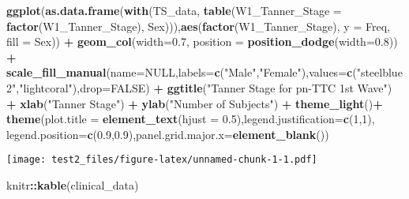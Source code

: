 \documentclass[]{article}
\newenvironment{Shaded}{\begin{snugshade}}{\end{snugshade}}
\newcommand{\KeywordTok}[1]{\textcolor[rgb]{0.13,0.29,0.53}{\textbf{#1}}}
\newcommand{\DataTypeTok}[1]{\textcolor[rgb]{0.13,0.29,0.53}{#1}}
\newcommand{\DecValTok}[1]{\textcolor[rgb]{0.00,0.00,0.81}{#1}}
\newcommand{\FloatTok}[1]{\textcolor[rgb]{0.00,0.00,0.81}{#1}}
\newcommand{\StringTok}[1]{\textcolor[rgb]{0.31,0.60,0.02}{#1}}
\newcommand{\OtherTok}[1]{\textcolor[rgb]{0.56,0.35,0.01}{#1}}
\newcommand{\OperatorTok}[1]{\textcolor[rgb]{0.81,0.36,0.00}{\textbf{#1}}}
\newcommand{\NormalTok}[1]{#1}
\begin{document}
\begin{Shaded}
\begin{Highlighting}[]
\KeywordTok{ggplot}\NormalTok{(}\KeywordTok{as.data.frame}\NormalTok{(}\KeywordTok{with}\NormalTok{(TS_data, }\KeywordTok{table}\NormalTok{(}\DataTypeTok{W1_Tanner_Stage =} \KeywordTok{factor}\NormalTok{(W1_Tanner_Stage), Sex))),}\KeywordTok{aes}\NormalTok{(}\KeywordTok{factor}\NormalTok{(W1_Tanner_Stage), }\DataTypeTok{y =}\NormalTok{ Freq, }\DataTypeTok{fill =}\NormalTok{ Sex)) }\OperatorTok{+}
\StringTok{  }\KeywordTok{geom_col}\NormalTok{(}\DataTypeTok{width=}\FloatTok{0.7}\NormalTok{, }\DataTypeTok{position =} \KeywordTok{position_dodge}\NormalTok{(}\DataTypeTok{width=}\FloatTok{0.8}\NormalTok{)) }\OperatorTok{+}\StringTok{ }
\StringTok{  }\KeywordTok{scale_fill_manual}\NormalTok{(}\DataTypeTok{name=}\OtherTok{NULL}\NormalTok{,}\DataTypeTok{labels=}\KeywordTok{c}\NormalTok{(}\StringTok{"Male"}\NormalTok{,}\StringTok{"Female"}\NormalTok{),}\DataTypeTok{values=}\KeywordTok{c}\NormalTok{(}\StringTok{"steelblue2"}\NormalTok{,}\StringTok{"lightcoral"}\NormalTok{),}\DataTypeTok{drop=}\OtherTok{FALSE}\NormalTok{) }\OperatorTok{+}
\StringTok{  }\KeywordTok{ggtitle}\NormalTok{(}\StringTok{"Tanner Stage for pn-TTC 1st Wave"}\NormalTok{) }\OperatorTok{+}
\StringTok{  }\KeywordTok{xlab}\NormalTok{(}\StringTok{"Tanner Stage"}\NormalTok{) }\OperatorTok{+}
\StringTok{  }\KeywordTok{ylab}\NormalTok{(}\StringTok{"Number of Subjects"}\NormalTok{) }\OperatorTok{+}
\StringTok{  }\KeywordTok{theme_light}\NormalTok{()}\OperatorTok{+}
\StringTok{  }\KeywordTok{theme}\NormalTok{(}\DataTypeTok{plot.title =} \KeywordTok{element_text}\NormalTok{(}\DataTypeTok{hjust =} \FloatTok{0.5}\NormalTok{),}\DataTypeTok{legend.justification=}\KeywordTok{c}\NormalTok{(}\DecValTok{1}\NormalTok{,}\DecValTok{1}\NormalTok{), }\DataTypeTok{legend.position=}\KeywordTok{c}\NormalTok{(}\FloatTok{0.9}\NormalTok{,}\FloatTok{0.9}\NormalTok{),}\DataTypeTok{panel.grid.major.x=}\KeywordTok{element_blank}\NormalTok{())}
\end{Highlighting}
\end{Shaded}

\texttt{[image: test2\_files/figure-latex/unnamed-chunk-1-1.pdf]}

\begin{Shaded}
\begin{Highlighting}[]
\NormalTok{knitr}\OperatorTok{::}\KeywordTok{kable}\NormalTok{(clinical_data)}
\end{Highlighting}
\end{Shaded}
\end{document}
